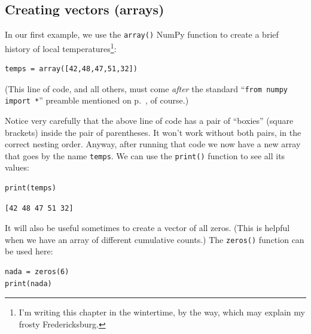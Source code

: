 \subsection*{Creating vectors (arrays)}

In our first example, we use the \texttt{array()} NumPy function to create a
brief history of local temperatures\footnote{I'm writing this chapter in the
wintertime, by the way, which may explain my frosty Fredericksburg.}:

\vspace{-.1in}
\begin{Verbatim}[fontsize=\small,samepage=true,frame=single,framesep=3mm]
temps = array([42,48,47,51,32])
\end{Verbatim}
\vspace{-.15in}


(This line of code, and all others, must come \textit{after} the standard
``\texttt{from numpy import *}'' preamble mentioned on
p.~\pageref{importNumpy}, of course.)

Notice very carefully that the above line of code has a pair of ``boxies''
(square brackets) inside the pair of parentheses. It won't work without both
pairs, in the correct nesting order. Anyway, after running that code we now
have a new array that goes by the name \texttt{temps}. We can use the
\texttt{print()} function to see all its values:

\begin{Verbatim}[fontsize=\small,samepage=true,frame=single,framesep=3mm]
print(temps)
\end{Verbatim}

\vspace{-.2in}
\begin{Verbatim}[fontsize=\small,samepage=true,frame=leftline,framesep=5mm,framerule=1mm]
[42 48 47 51 32]
\end{Verbatim}

\medskip
{}
It will also be useful sometimes to create a vector of all zeros. (This is
helpful when we have an array of different cumulative counts.) The
\texttt{zeros()} function can be used here:

\begin{Verbatim}[fontsize=\small,samepage=true,frame=single,framesep=3mm]
nada = zeros(6)
print(nada)
\end{Verbatim}
\vspace{-.2in}

